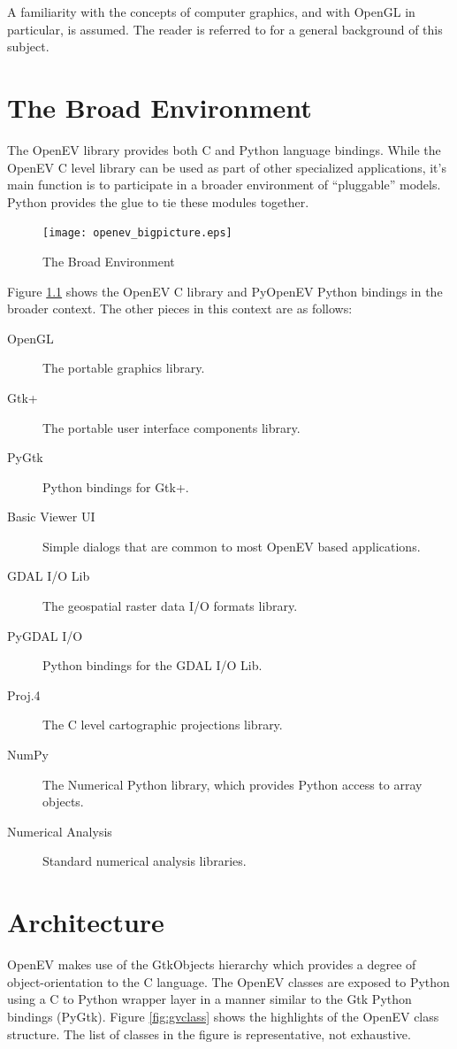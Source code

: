 \documentclass{openevreport}
\begin{document}
A familiarity with the concepts of computer graphics, and with OpenGL
in particular, is assumed.  The reader is referred to \cite{woo:opengl}
for a general background of this subject.

\chapter{The Broad Environment}

The OpenEV library provides both C and Python language bindings.  While
the OpenEV C level library can be used as part of other specialized
applications, it's main function is to participate in a broader
environment of ``pluggable'' models.  Python provides the glue to tie
these modules together.

\begin{figure}
\centering
\texttt{[image: openev\_bigpicture.eps]}
\caption{The Broad Environment}
\label{fig:bigpicture}
\end{figure}

Figure \ref{fig:bigpicture} shows the OpenEV C library and PyOpenEV
Python bindings in the broader context.  The other pieces in this
context are as follows:
\begin{description}
\item[OpenGL] The portable graphics library.
\item[Gtk+] The portable user interface components library.
\item[PyGtk] Python bindings for Gtk+.
\item[Basic Viewer UI] Simple dialogs that are common to most OpenEV
based applications.
\item[GDAL I/O Lib] The geospatial raster data I/O formats library.
\item[PyGDAL I/O] Python bindings for the GDAL I/O Lib.
\item[Proj.4] The C level cartographic projections library.
\item[NumPy] The Numerical Python library, which provides Python
access to array objects.
\item[Numerical Analysis] Standard numerical analysis libraries.
\end{description}

\chapter{Architecture}

OpenEV makes use of the GtkObjects hierarchy which provides a degree of
object-orientation to the C language.  The OpenEV classes are exposed
to Python using a C to Python wrapper layer in a manner similar to the
Gtk Python bindings (PyGtk)\cite{gtk.org}.  Figure \ref{fig:gvclass}
shows the highlights of the OpenEV class structure.  The list of
classes in the figure is representative, not exhaustive.
\end{document}
